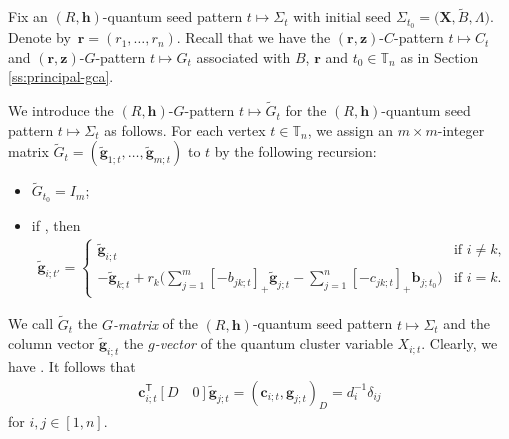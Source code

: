 \documentclass[pdftex]{sigma}
\numberwithin{equation}{section}
\begin{document}
Fix an $(R,\mathbf{h})$-quantum seed pattern $t\mapsto \Sigma_t$ with initial seed $\Sigma_{t_0}=\bigl(\mathbf{X},\tilde{B},\Lambda\bigr)$. Denote by~${\mathbf{r}=(r_1,\dots, r_n)}$. Recall that we have the $(\mathbf{r},\mathbf{z})$-$C$-pattern $t\mapsto C_t$ and $(\mathbf{r},\mathbf{z})$-$G$-pattern $t\mapsto G_t$ associated with $B$, $\mathbf{r}$ and $t_0\in \mathbb{T}_n$ as in Section \ref{ss:principal-gca}.

We introduce the $(R,\mathbf{h})$-$G$-pattern $t\mapsto \tilde{G}_t$ for the $(R,\mathbf{h})$-quantum seed pattern $t\mapsto \Sigma_t$ as follows.
 For each vertex $t\in \mathbb{T}_n$, we assign an $m\times m$-integer matrix $\tilde{G}_t=(\tilde{\mathbf{g}}_{1;t},\dots, \tilde{\mathbf{g}}_{m;t})$ to $t$ by the following recursion:
\begin{itemize}\itemsep=0pt
 \item[(1)] $\tilde{G}_{t_0}=I_m$;
 \item[(2)] if , then
 \begin{align}\label{eq:g-formula}
 \mathbf{\tilde{g}}_{i;t'}=
 \begin{cases}
 \mathbf{\tilde{g}}_{i;t} & \text{if } i\neq k,\\
 \displaystyle -\mathbf{\tilde{g}}_{k;t}+r_{k}\biggl(\sum\limits_{j=1}^{m}[-b_{jk;t}]_+\mathbf{\tilde{g}}_{j;t}-\sum\limits_{j=1}^{n}[- c_{jk;t}]_+\mathbf{b}_{j;t_0}\biggr) & \text{if }i=k.
 \end{cases}
 \end{align}

\end{itemize}
We call $\tilde{G}_t$ the {\it $G$-matrix} of the $(R,\mathbf{h})$-quantum seed pattern $t\mapsto \Sigma_t$ and the column vector $\tilde{\mathbf{g}}_{i;t}$ the {\it $g$-vector} of the quantum cluster variable $X_{i;t}$.
Clearly, we have . It follows that
\begin{align}\label{D_form_duality}
 \mathbf{c}^{\mathsf T}_{i;t}[D\quad 0]\mathbf{\tilde{g}}_{j;t}=(\mathbf{c}_{i;t},\mathbf{g}_{j;t})_D=d_{i}^{-1}\delta_{ij}
\end{align}
for $i,j\in[1,n]$.
\end{document}
